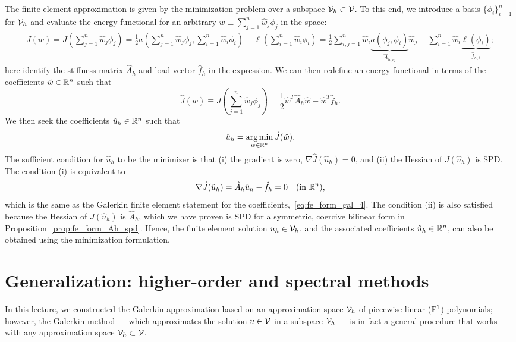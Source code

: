 The finite element approximation is given by the minimization problem over a subspace $\mathcal{V}_h \subset \mathcal{V}$. To this end, we introduce a basis $\{\phi_i\}_{i=1}^n$ for $\mathcal{V}_h$ and evaluate the energy functional for an arbitrary $w \equiv \sum_{j=1}^n \hat w_j \phi_j$ in the space:
\begin{align*}
  J(w) =  J(\sum_{j=1}^n \hat w_j \phi_j)
  = \frac{1}{2} a (\sum_{j=1}^n \hat w_j \phi_j, \sum_{i=1}^n \hat w_i \phi_i) - \ell(\sum_{i=1}^n \hat w_i \phi_i)
  = \frac{1}{2} \sum_{i,j=1}^n \hat w_i \underbrace{ a(\phi_j,\phi_i) }_{\hat A_{h,ij}} \hat w_j - \sum_{i=1}^n \hat w_i \underbrace{ \ell(\phi_i) }_{\hat f_{h,i}};
\end{align*}
here identify the stiffness matrix $\hat A_h$ and load vector $\hat f_h$ in the expression. We can then redefine an energy functional in terms of the coefficients $\hat w \in \mathbb{R}^n$ such that 
\begin{equation*}
  \hat J(\hat w) \equiv J(\sum_{j=1}^n \hat w_j \phi_j)
  = \frac{1}{2} \hat w^T \hat A_h \hat w - \hat w^T \hat f_h.
\end{equation*}
We then seek the coefficients $\hat u_h \in \mathbb{R}^n$ such that
\begin{equation*}
  \hat u_h = \operatorname*{arg\,min}_{\hat w \in \mathbb{R}^n} \hat J(\hat w).
\end{equation*}
The sufficient condition for $\hat u_h$ to be the minimizer is that (i) the gradient is zero, $\nabla \hat J(\hat u_h) = 0$, and (ii) the Hessian of $J(\hat u_h)$ is SPD.  The condition (i) is equivalent to
\begin{equation*}
  \nabla \hat J(\hat u_h) = \hat A_h \hat u_h - \hat f_h = 0 \quad (\text{in } \mathbb{R}^n),
\end{equation*}
which is the same as the Galerkin finite element statement for the coefficients,~\ref{eq:fe_form_gal_4}.  The condition (ii) is also satisfied because the Hessian of $J(\hat u_h)$ is $\hat A_h$, which we have proven is SPD for a symmetric, coercive bilinear form in Proposition~\eqref{prop:fe_form_Ah_spd}. Hence, the finite element solution $u_h \in \mathcal{V}_h$, and the associated coefficients $\hat u_h \in \mathbb{R}^n$, can also be obtained using the minimization formulation.

\section{Generalization: higher-order and spectral methods}
In this lecture, we constructed the Galerkin approximation based on an approximation space $\mathcal{V}_h$ of piecewise linear ($\mathbb{P}^1$) polynomials; however, the Galerkin method --- which approximates the solution $u \in \mathcal{V}$ in a subspace $\mathcal{V}_h$ --- is in fact a general procedure that works with any approximation space $\mathcal{V}_h \subset \mathcal{V}$.

